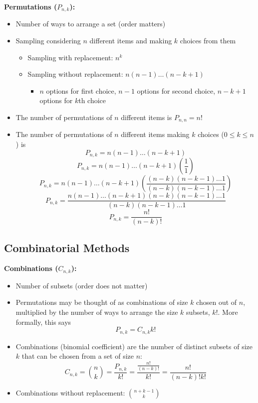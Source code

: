 \documentclass[11pt]{article}
\begin{document}
\textbf{Permutations ($P_{n,k}$):}
\begin{itemize}
    \item Number of ways to arrange a set (order matters)
    \item Sampling considering $n$ different items and making $k$ choices from them
    \begin{itemize}
        \item Sampling with replacement: $n^k$
        \item Sampling without replacement: $n(n-1) \ldots (n-k+1)$
        \begin{itemize}
            \item $n$ options for first choice, $n-1$ options for second choice, $n-k+1$ 
            options for $k$th choice
        \end{itemize}
    \end{itemize}
    
    \item The number of permutations of $n$ different items is $P_{n,n} = n$!
    \item The number of permutations of $n$ different items making $k$ choices ($0 \le k \le 
    n$) is
        \[P_{n,k} = n(n-1) \ldots (n-k+1)\]
        \[P_{n,k} = n(n-1) \ldots (n-k+1) \left(\frac{1}{1}\right)\]
        \[P_{n,k} = n(n-1) \ldots (n-k+1) \left(\frac{(n-k)(n-k-1) \ldots 1}{(n-k)(n-k-1) 
        \ldots 1}\right)\]
        \[P_{n,k} = \frac{n(n-1) \ldots (n-k+1)(n-k)(n-k-1) \ldots 1}{(n-k)(n-k-1) \ldots 1}\]
        \[P_{n,k} = \frac{n!}{(n-k)!}\]
\end{itemize}

\subsection{Combinatorial Methods}
\textbf{Combinations ($C_{n,k}$):}
\begin{itemize}
    \item Number of subsets (order does not matter)
    \item Permutations may be thought of as combinations of size $k$ chosen out of $n$, 
    multiplied by the number of ways to arrange the size $k$ subsets, $k$!. More formally, this
    says 
    \[ P_{n,k} = C_{n,k} k!\]
    \item Combinations (binomial coefficient) are the number of distinct subsets of size $k$ 
    that can be chosen from a set of size $n$: 
        \[C_{n,k} = {n \choose k} = \frac{P_{n,k}}{k!} = \frac{\frac{n!}{(n-k)!}}{k!} =  \frac{n!}{(n-k)!k!} \]
    \item Combinations without replacement: ${n+k-1 \choose k}$
\end{itemize}
\end{document}
